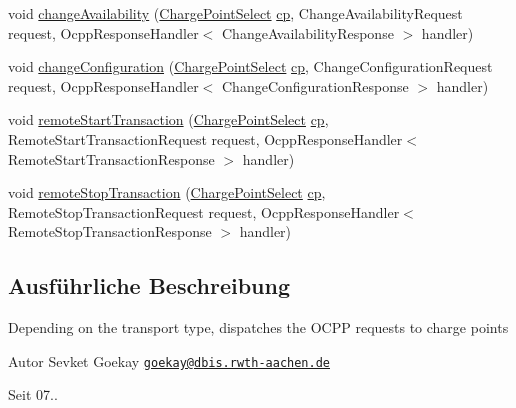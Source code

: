 \begin{DoxyCompactItemize}
\item 
void \hyperlink{classde_1_1rwth_1_1idsg_1_1steve_1_1service_1_1_charge_point_service12___dispatcher_a456a1b581ae79d2fe39eb5c8278c1980}{change\+Availability} (\hyperlink{classde_1_1rwth_1_1idsg_1_1steve_1_1repository_1_1dto_1_1_charge_point_select}{Charge\+Point\+Select} \hyperlink{get_transaction_ids_8js_a02fb69feb56940fd46d72ea6a60e511f}{cp}, Change\+Availability\+Request request, Ocpp\+Response\+Handler$<$ Change\+Availability\+Response $>$ handler)
\item 
void \hyperlink{classde_1_1rwth_1_1idsg_1_1steve_1_1service_1_1_charge_point_service12___dispatcher_a3f4f91156db702b0226755045937434b}{change\+Configuration} (\hyperlink{classde_1_1rwth_1_1idsg_1_1steve_1_1repository_1_1dto_1_1_charge_point_select}{Charge\+Point\+Select} \hyperlink{get_transaction_ids_8js_a02fb69feb56940fd46d72ea6a60e511f}{cp}, Change\+Configuration\+Request request, Ocpp\+Response\+Handler$<$ Change\+Configuration\+Response $>$ handler)
\item 
void \hyperlink{classde_1_1rwth_1_1idsg_1_1steve_1_1service_1_1_charge_point_service12___dispatcher_ae54a05abc6053b4a4b996222110dfb74}{remote\+Start\+Transaction} (\hyperlink{classde_1_1rwth_1_1idsg_1_1steve_1_1repository_1_1dto_1_1_charge_point_select}{Charge\+Point\+Select} \hyperlink{get_transaction_ids_8js_a02fb69feb56940fd46d72ea6a60e511f}{cp}, Remote\+Start\+Transaction\+Request request, Ocpp\+Response\+Handler$<$ Remote\+Start\+Transaction\+Response $>$ handler)
\item 
void \hyperlink{classde_1_1rwth_1_1idsg_1_1steve_1_1service_1_1_charge_point_service12___dispatcher_a5f6866aa5df77bdde54f536f006c35be}{remote\+Stop\+Transaction} (\hyperlink{classde_1_1rwth_1_1idsg_1_1steve_1_1repository_1_1dto_1_1_charge_point_select}{Charge\+Point\+Select} \hyperlink{get_transaction_ids_8js_a02fb69feb56940fd46d72ea6a60e511f}{cp}, Remote\+Stop\+Transaction\+Request request, Ocpp\+Response\+Handler$<$ Remote\+Stop\+Transaction\+Response $>$ handler)
\end{DoxyCompactItemize}


\subsection{Ausführliche Beschreibung}
Depending on the transport type, dispatches the O\+C\+P\+P requests to charge points

\begin{DoxyAuthor}{Autor}
Sevket Goekay \href{mailto:goekay@dbis.rwth-aachen.de}{\tt goekay@dbis.\+rwth-\/aachen.\+de} 
\end{DoxyAuthor}
\begin{DoxySince}{Seit}
07.. 
\end{DoxySince}


